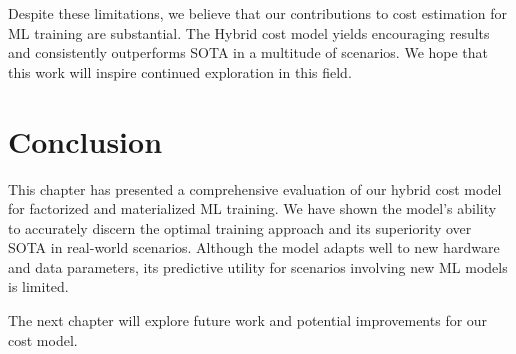 Despite these limitations, we believe that our contributions to cost estimation for ML training are substantial. The Hybrid cost model yields encouraging results and consistently outperforms SOTA in a multitude of scenarios. We hope that this work will inspire continued exploration in this field.

\section{Conclusion}
\label{sec:eval-conclusion}
This chapter has presented a comprehensive evaluation of our hybrid cost model for factorized and materialized ML training. We have shown the model's ability to accurately discern the optimal training approach and its superiority over SOTA in real-world scenarios. Although the model adapts well to new hardware and data parameters, its predictive utility for scenarios involving new ML models is limited.

The next chapter will explore future work and potential improvements for our cost model.

